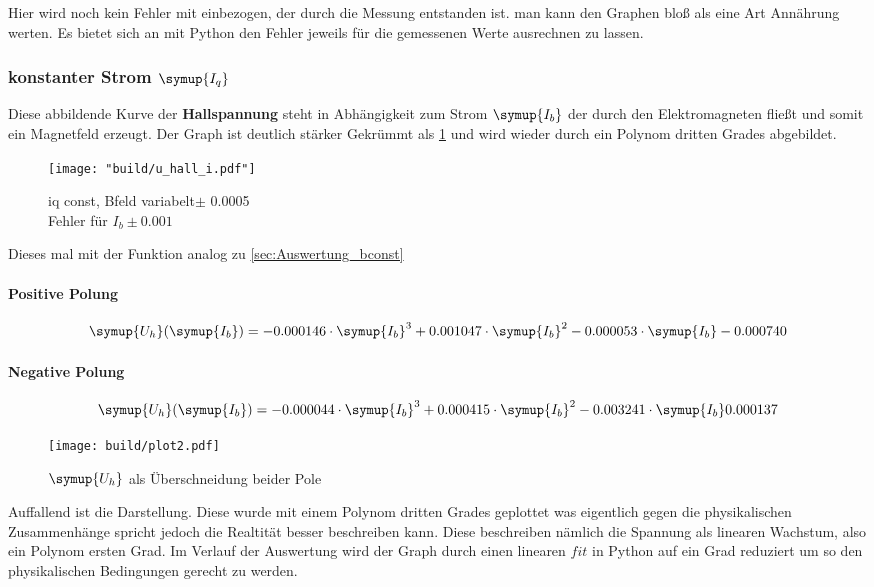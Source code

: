 Hier wird noch kein Fehler mit einbezogen, der durch die Messung entstanden ist. man kann den Graphen bloß als eine Art Annährung werten. 
Es bietet sich an mit Python den Fehler jeweils für die gemessenen Werte ausrechnen zu lassen.


\subsubsection{konstanter Strom $\symup{I_q}$}
\label{sec:Auswertung_iconst}

Diese abbildende  Kurve der \textbf{Hallspannung} steht in Abhängigkeit zum Strom $\symup{I_b}$ der durch den Elektromagneten fließt und somit ein Magnetfeld erzeugt.
Der Graph ist deutlich stärker Gekrümmt als \ref{fig:Uhall} und wird wieder durch ein Polynom dritten Grades abgebildet. 


\begin{figure}
   \centering
    \texttt{[image: "build/u\_hall\_i.pdf"]}
    \caption{iq const, Bfeld variabelt$\pm$ 0.0005\\Fehler für $I_b \pm 0.001$}
    \label{fig:Uhall}
 \end{figure}



Dieses mal mit der Funktion analog zu \ref{sec:Auswertung_bconst}
\paragraph{Positive Polung}


\begin{equation}
   \symup{U_h}(\symup{I_b})=-0.000146 \cdot \symup{I_b}^3 + 0.001047\cdot\symup{I_b}^2 -0.000053\cdot\symup{I_b} -0.000740
\end{equation}

\paragraph{Negative Polung}

\begin{equation}
   \symup{U_h}(\symup{I_b})=-0.000044 \cdot \symup{I_b}^3 + 0.000415\cdot\symup{I_b}^2 -0.003241\cdot\symup{I_b} 0.000137
\end{equation}

\begin{figure}[!h]
   \centering
   \texttt{[image: build/plot2.pdf]} %
   \caption{$\symup{U_h}$ als Überschneidung beider Pole}
   \label{fig:auswertunghall}
\end{figure}

Auffallend ist die Darstellung. Diese wurde mit einem Polynom dritten Grades geplottet was eigentlich gegen die physikalischen Zusammenhänge
spricht jedoch die Realtität besser beschreiben kann. Diese beschreiben nämlich die Spannung als linearen Wachstum, also ein Polynom ersten Grad. Im Verlauf der Auswertung wird der Graph durch einen linearen $fit$
in Python auf ein Grad reduziert um so den physikalischen Bedingungen gerecht zu werden.



%
